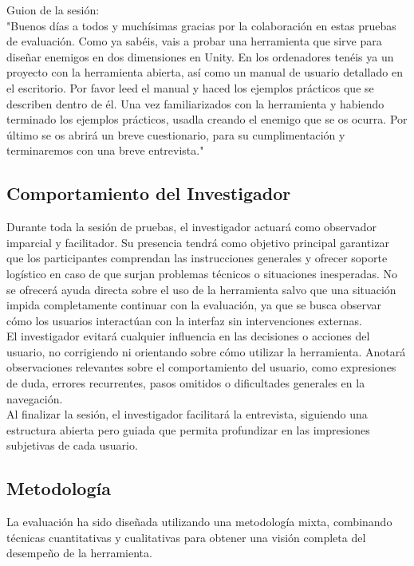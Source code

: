 Guion de la sesión:\\

"Buenos días a todos y muchísimas gracias por la colaboración en estas pruebas de evaluación.
Como ya sabéis, vais a probar una herramienta que sirve para diseñar enemigos en dos dimensiones en Unity.
En los ordenadores tenéis ya un proyecto con la herramienta abierta, así como un manual de usuario detallado en el escritorio.
Por favor leed el manual y haced los ejemplos prácticos que se describen dentro de él. Una vez familiarizados con la herramienta y habiendo terminado los ejemplos prácticos, usadla creando el enemigo que se os ocurra.
Por último se os abrirá un breve cuestionario, para su cumplimentación y terminaremos con una breve entrevista."

\subsection{Comportamiento del Investigador}

Durante toda la sesión de pruebas, el investigador actuará como observador imparcial y facilitador. Su presencia tendrá como objetivo principal garantizar que los participantes comprendan las instrucciones generales y ofrecer soporte logístico en caso de que surjan problemas técnicos o situaciones inesperadas. No se ofrecerá ayuda directa sobre el uso de la herramienta salvo que una situación impida completamente continuar con la evaluación, ya que se busca observar cómo los usuarios interactúan con la interfaz sin intervenciones externas.\\

El investigador evitará cualquier influencia en las decisiones o acciones del usuario, no corrigiendo ni orientando sobre cómo utilizar la herramienta. Anotará observaciones relevantes sobre el comportamiento del usuario, como expresiones de duda, errores recurrentes, pasos omitidos o dificultades generales en la navegación.\\

Al finalizar la sesión, el investigador facilitará la entrevista, siguiendo una estructura abierta pero guiada que permita profundizar en las impresiones subjetivas de cada usuario.\\

\subsection{Metodología}

La evaluación ha sido diseñada utilizando una metodología mixta, combinando técnicas cuantitativas y cualitativas para obtener una visión completa del desempeño de la herramienta.
